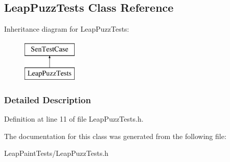 \hypertarget{interface_leap_puzz_tests}{\subsection{Leap\-Puzz\-Tests Class Reference}
\label{da/da0/interface_leap_puzz_tests}
}
Inheritance diagram for Leap\-Puzz\-Tests\-:\begin{figure}[H]
\begin{center}
\leavevmode
\includegraphics[height=2.000000cm]{da/da0/interface_leap_puzz_tests}
\end{center}
\end{figure}


\subsubsection{Detailed Description}


Definition at line 11 of file Leap\-Puzz\-Tests.\-h.



The documentation for this class was generated from the following file\-:\begin{DoxyCompactItemize}
\item 
Leap\-Paint\-Tests/Leap\-Puzz\-Tests.\-h\end{DoxyCompactItemize}
